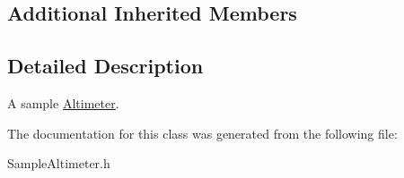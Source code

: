 \subsection*{Additional Inherited Members}


\subsection{Detailed Description}
A sample \hyperlink{class_efficio_1_1_sensors_1_1_altimeter}{Altimeter}. 

The documentation for this class was generated from the following file\+:\begin{DoxyCompactItemize}
\item 
Sample\+Altimeter.\+h\end{DoxyCompactItemize}
